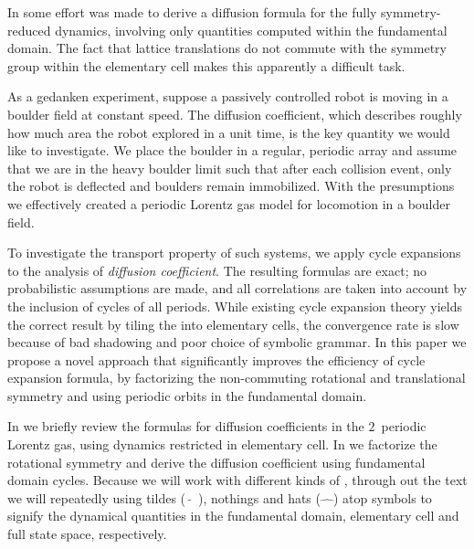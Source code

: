 In  some effort was made to derive a diffusion formula
for the fully symmetry-reduced dynamics, involving only
quantities computed within the fundamental domain. The
fact that lattice translations do not commute with the symmetry group within
the elementary cell makes this apparently a difficult task.


As a gedanken experiment, suppose a passively controlled robot is moving in a boulder field at constant speed. The diffusion coefficient, which describes roughly how much area the robot explored in a unit time, is the key quantity we would like to investigate. We place the boulder in a regular, periodic array and assume that we are in the heavy boulder limit such that after each collision event, only the robot is deflected and boulders remain immobilized. With the presumptions we effectively created a periodic Lorentz gas model for locomotion in a boulder field.

To investigate the transport property of such systems, we apply cycle expansions to the analysis of {\em diffusion coefficient}. The resulting formulas are exact; no probabilistic assumptions are made, and all correlations are taken into account by the  inclusion of cycles of all periods. While existing cycle expansion theory yields the correct result by tiling the {\statesp} into elementary cells, the convergence rate is slow because of bad shadowing and poor choice of symbolic grammar. In this paper we propose a novel approach that significantly improves the efficiency of cycle expansion formula, by factorizing the non-commuting rotational and translational symmetry and using periodic orbits in the fundamental domain.


In  we briefly review the formulas for diffusion coefficients in the $2$\dmn\ periodic Lorentz gas, using dynamics restricted in elementary cell. In we factorize the rotational symmetry and derive the diffusion coefficient using fundamental domain cycles. Because we will work with different kinds of \statesp, through out the text we will repeatedly using tildes ($\tilde{\quad}$), nothings and hats ($\hat{\quad}$) atop symbols to signify the dynamical quantities in the fundamental domain, elementary cell and full state space, respectively.
